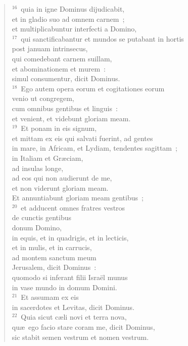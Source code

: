 \begin{flushleft}
\begin{verse}
${}^{16}$~quia in igne Dominus dijudicabit,\\ et in gladio suo ad omnem carnem~;\\ et multiplicabuntur interfecti a Domino,\\
${}^{17}$~qui sanctificabantur et mundos se putabant in hortis\\ post januam intrinsecus,\\ qui comedebant carnem suillam,\\ et abominationem et murem~:\\ simul consumentur, dicit Dominus.\\
${}^{18}$~Ego autem opera eorum et cogitationes eorum\\ venio ut congregem,\\ cum omnibus gentibus et linguis~:\\ et venient, et videbunt gloriam meam.\\
${}^{19}$~Et ponam in eis signum,\\ et mittam ex eis qui salvati fuerint, ad gentes\\ in mare, in Africam, et Lydiam, tendentes sagittam~;\\ in Italiam et Gr\ae ciam,\\ ad insulas longe,\\ ad eos qui non audierunt de me,\\ et non viderunt gloriam meam.\\ Et annuntiabunt gloriam meam gentibus~;\\
${}^{20}$~et adducent omnes fratres vestros\\ de cunctis gentibus\\ donum Domino,\\ in equis, et in quadrigis, et in lecticis,\\ et in mulis, et in carrucis,\\ ad montem sanctum meum\\ Jerusalem, dicit Dominus~:\\ quomodo si inferant filii Isra\"el munus\\ in vase mundo in domum Domini.\\
${}^{21}$~Et assumam ex eis\\ in sacerdotes et Levitas, dicit Dominus.\\
${}^{22}$~Quia sicut c\ae li novi et terra nova,\\ qu\ae\ ego facio stare coram me, dicit Dominus,\\ sic stabit semen vestrum et nomen vestrum.\\

\end{verse}
\end{flushleft}
